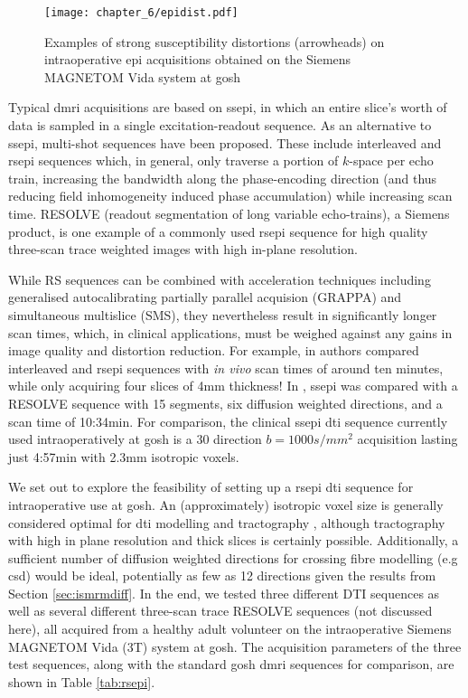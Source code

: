 \begin{figure}[h!]
  \texttt{[image: chapter\_6/epidist.pdf]}
  \caption{Examples of strong susceptibility distortions (arrowheads) on intraoperative \gls{epi} acquisitions obtained on the Siemens MAGNETOM Vida system at \gls{gosh}}
  \label{fig:epi}
\end{figure}

Typical \gls{dmri} acquisitions are based on \gls{ssepi}, in which an entire slice's worth of data is sampled in a single excitation-readout sequence.
As an alternative to \gls{ssepi}, multi-shot sequences have been proposed.
These include interleaved and \gls{rsepi} sequences which, in general, only traverse a portion of $k$-space per echo train, increasing the bandwidth along the phase-encoding direction (and thus reducing field inhomogeneity induced phase accumulation) while increasing scan time\autocite{Wang2018}.
RESOLVE (readout segmentation of long variable echo-trains), a Siemens product, is one example of a commonly used \gls{rsepi} sequence for high quality three-scan trace weighted images with high in-plane resolution.

While RS sequences can be combined with acceleration techniques including generalised autocalibrating partially parallel acquision (GRAPPA) and simultaneous multislice (SMS), they nevertheless result in significantly longer scan times, which, in clinical applications, must be weighed against any gains in image quality and distortion reduction.
For example, in \textcite{Wang2018} authors compared interleaved and \gls{rsepi} sequences with \textit{in vivo} scan times of around ten minutes, while only acquiring four slices of 4mm thickness!
In \textcite{Elliott2020}, \gls{ssepi} was compared with a RESOLVE sequence with 15 segments, six diffusion weighted directions, and a scan time of 10:34min.
For comparison, the clinical \gls{ssepi} \gls{dti} sequence currently used intraoperatively at \gls{gosh} is a 30 direction $b=1000s/mm^2$ acquisition lasting just 4:57min with 2.3mm isotropic voxels.

We set out to explore the feasibility of setting up a \gls{rsepi} \gls{dti} sequence for intraoperative use at \gls{gosh}.
An (approximately) isotropic voxel size is generally considered optimal for \gls{dti} modelling and tractography \autocite{Vos2011, Neher2013}, although tractography with high in plane resolution and thick slices is certainly possible.
Additionally, a sufficient number of diffusion weighted directions for crossing fibre modelling (e.g \gls{csd}) would be ideal, potentially as few as 12 directions given the results from Section \ref{sec:ismrmdiff}.
In the end, we tested three different DTI sequences as well as several different three-scan trace RESOLVE sequences (not discussed here), all acquired from a healthy adult volunteer on the intraoperative Siemens MAGNETOM Vida (3T) system at \gls{gosh}.
The acquisition parameters of the three test sequences, along with the standard \gls{gosh} \gls{dmri} sequences for comparison, are shown in Table \ref{tab:rsepi}.

